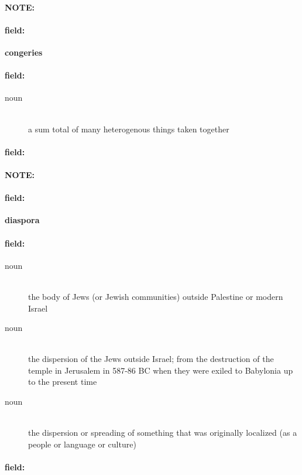 \documentclass[12pt]{article}
\newenvironment{note}{\paragraph{NOTE:}}{}
\newenvironment{field}{\paragraph{field:}}{}
\begin{document}
\begin{note}
\begin{field}
\textbf{\large congeries}
\end{field}


\begin{field}
\begin{description}
\item[noun] \hfill \\ 
a sum total of many heterogenous things taken together

\end{description}
\end{field}

\begin{field}
\end{field}
\end{note}
\begin{note}
\begin{field}
\textbf{\large diaspora}
\end{field}


\begin{field}
\begin{description}
\item[noun] \hfill \\ 
the body of Jews (or Jewish communities) outside Palestine or modern Israel

\item[noun] \hfill \\ 
the dispersion of the Jews outside Israel; from the destruction of the temple in Jerusalem in 587-86 BC when they were exiled to Babylonia up to the present time

\item[noun] \hfill \\ 
the dispersion or spreading of something that was originally localized (as a people or language or culture)

\end{description}
\end{field}

\begin{field}
\end{field}
\end{note}
\end{document}
